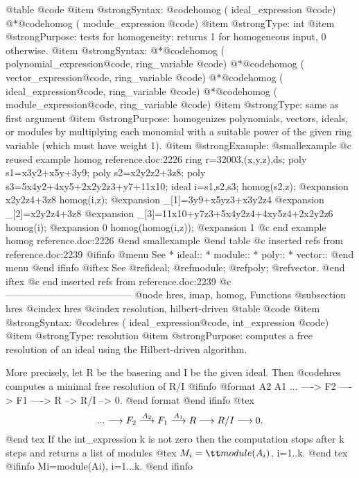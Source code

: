 {@table @code
@item @strong{Syntax:}
@code{homog (} ideal_expression @code{)}
@*@code{homog (} module_expression @code{)}
@item @strong{Type:}
int
@item @strong{Purpose:}
tests for homogeneity: returns 1 for homogeneous input, 0 otherwise.
@item @strong{Syntax:}
@*@code{homog (} polynomial_expression@code{,} ring_variable @code{)}
@*@code{homog (} vector_expression@code{,} ring_variable @code{)}
@*@code{homog (} ideal_expression@code{,} ring_variable @code{)}
@*@code{homog (} module_expression@code{,} ring_variable @code{)}
@item @strong{Type:}
same as first argument
@item @strong{Purpose:}
homogenizes polynomials, vectors, ideals, or modules by multiplying
each monomial with a suitable power of the given ring variable (which must have
weight 1).
@item @strong{Example:}
@smallexample
@c reused example homog reference.doc:2226 
  ring r=32003,(x,y,z),ds;
  poly s1=x3y2+x5y+3y9;
  poly s2=x2y2z2+3z8;
  poly s3=5x4y2+4xy5+2x2y2z3+y7+11x10;
  ideal i=s1,s2,s3;
  homog(s2,z);
@expansion{} x2y2z4+3z8
  homog(i,z);
@expansion{} _[1]=3y9+x5yz3+x3y2z4
@expansion{} _[2]=x2y2z4+3z8
@expansion{} _[3]=11x10+y7z3+5x4y2z4+4xy5z4+2x2y2z6
  homog(i);
@expansion{} 0
  homog(homog(i,z));
@expansion{} 1
@c end example homog reference.doc:2226
@end smallexample
@end table
@c inserted refs from reference.doc:2239
@ifinfo
@menu
See
* ideal::
* module::
* poly::
* vector::
@end menu
@end ifinfo
@iftex
See
@ref{ideal};
@ref{module};
@ref{poly};
@ref{vector}.
@end iftex
@c end inserted refs from reference.doc:2239
@c ---------------------------------------
@node hres, imap, homog, Functions
@subsection hres
@cindex hres
@cindex resolution, hilbert-driven
@table @code
@item @strong{Syntax:}
@code{hres (} ideal_expression@code{,} int_expression @code{)}
@item @strong{Type:}
resolution
@item @strong{Purpose:}
computes a free resolution of an ideal using the Hilbert-driven
algorithm.

More precisely, let R be the basering and I be the given ideal.
Then @code{hres} computes a minimal free resolution of R/I
@ifinfo
@format
                    A2       A1
      ... ----> F2 ----> F1 ----> R --> R/I --> 0.
@end format
@end ifinfo
@tex
$$...\longrightarrow F_2 \buildrel{A_2}\over{\longrightarrow} F_1
\buildrel{A_1}\over{\longrightarrow} R\longrightarrow R/I
\longrightarrow 0.$$
@end tex
If the int_expression k is not zero then the computation stops after
k steps and returns a list of modules
@tex
$M_i={\tt module} (A_i)$, i=1..k.
@end tex
@ifinfo
Mi=module(Ai), i=1...k.
@end ifinfo

}
